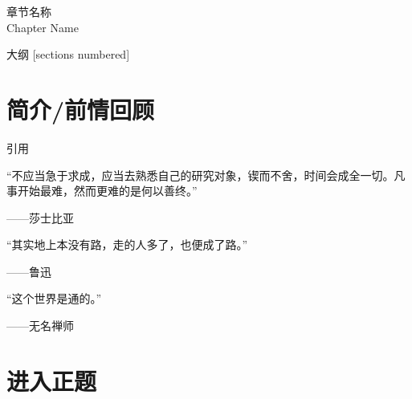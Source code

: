 \documentclass[algorithm,pgfplots]{styles/cuzbeamer}
\begin{document}
    
    \maketitle

    \begin{standout}[第X章]
        章节名称\\
        Chapter Name
    \end{standout}

    \begin{frame}{大纲}
        [sections numbered]
        \tableofcontents
    \end{frame}

    \section{简介/前情回顾}

    \begin{frame}
        \begin{block}{引用}
            \begin{leftbar}
                “不应当急于求成，应当去熟悉自己的研究对象，锲而不舍，时间会成全一切。凡事开始最难，然而更难的是何以善终。”\par
                \raggedleft ------莎士比亚
            \end{leftbar}
            \begin{leftbar}
                “其实地上本没有路，走的人多了，也便成了路。”\par
                \raggedleft ------鲁迅
            \end{leftbar}
            \begin{leftbar}
                “这个世界是通的。”\par
                \raggedleft ------无名禅师
            \end{leftbar}
        \end{block}
    \end{frame}

    \section{进入正题}
\end{document}
